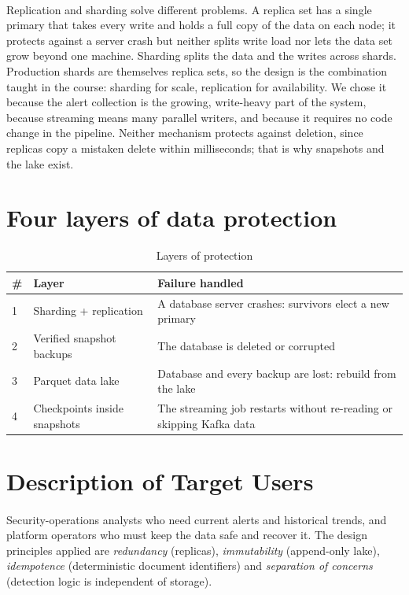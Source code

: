 \paragraph{}
Replication and sharding solve different problems. A replica set has a single primary that takes every write and holds a full copy of the data on each node; it protects against a server crash but neither splits write load nor lets the data set grow beyond one machine. Sharding splits the data and the writes across shards. Production shards are themselves replica sets, so the design is the combination taught in the course: sharding for scale, replication for availability. We chose it because the alert collection is the growing, write-heavy part of the system, because streaming means many parallel writers, and because it requires no code change in the pipeline. Neither mechanism protects against deletion, since replicas copy a mistaken delete within milliseconds; that is why snapshots and the lake exist.

\section{Four layers of data protection}
\begin{table}[H]
\centering
\begin{tabular}{|p{1cm}|p{4.2cm}|p{7.8cm}|}
\hline
\textbf{\#} & \textbf{Layer} & \textbf{Failure handled} \\ \hline
1 & Sharding + replication & A database server crashes: survivors elect a new primary \\ \hline
2 & Verified snapshot backups & The database is deleted or corrupted \\ \hline
3 & Parquet data lake & Database and every backup are lost: rebuild from the lake \\ \hline
4 & Checkpoints inside snapshots & The streaming job restarts without re-reading or skipping Kafka data \\ \hline
\end{tabular}
\caption{Layers of protection}
\end{table}

\section{Description of Target Users}
\paragraph{}
Security-operations analysts who need current alerts and historical trends, and platform operators who must keep the data safe and recover it. The design principles applied are \emph{redundancy} (replicas), \emph{immutability} (append-only lake), \emph{idempotence} (deterministic document identifiers) and \emph{separation of concerns} (detection logic is independent of storage).


